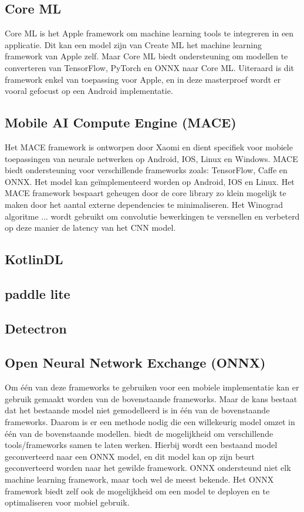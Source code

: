 \subsection{Core ML}
Core ML is het Apple framework om machine learning tools te integreren in een applicatie.
Dit kan een model zijn van Create ML het machine learning framework van Apple zelf.
Maar Core ML biedt ondersteuning om modellen te converteren van TensorFlow, PyTorch en ONNX naar Core ML.
Uiteraard is dit framework enkel van toepassing voor Apple, en in deze masterproef wordt er vooral gefocust op een Android implementatie.

\subsection{Mobile AI Compute Engine (MACE)}
Het MACE framework is ontworpen door Xaomi en dient specifiek voor mobiele toepassingen van neurale netwerken op Android, IOS, Linux en Windows.
MACE biedt ondersteuning voor verschillende frameworks zoals: TensorFlow, Caffe en ONNX.
Het model kan ge\"implementeerd worden op Android, IOS en Linux.
Het MACE framework bespaart geheugen door de core library zo klein mogelijk te maken door het aantal externe dependencies te minimaliseren.
Het Winograd algoritme ... wordt gebruikt om convolutie bewerkingen te versnellen en verbeterd op deze manier de latency van het CNN model.

\subsection{KotlinDL}

\subsection{paddle lite}

\subsection{Detectron}


\subsection{Open Neural Network Exchange (ONNX)}
Om \'e\'en van deze frameworks te gebruiken voor een mobiele implementatie kan er gebruik gemaakt worden van de bovenstaande frameworks.
Maar de kans bestaat dat het bestaande model niet gemodelleerd is in \'e\'en van de bovenstaande frameworks.
Daarom is er een methode nodig die een willekeurig model omzet in \'e\'en van de bovenstaande modellen.
\cite{onnx_onnx_2017} biedt de mogelijkheid om verschillende tools/frameworks samen te laten werken.
Hierbij wordt een bestaand model geconverteerd naar een ONNX model, en dit model kan op zijn beurt geconverteerd worden naar het gewilde framework.
ONNX ondersteund niet elk machine learning framework, maar toch wel de meest bekende.
Het ONNX framework biedt zelf ook de mogelijkheid om een model te deployen en te optimaliseren voor mobiel gebruik.

